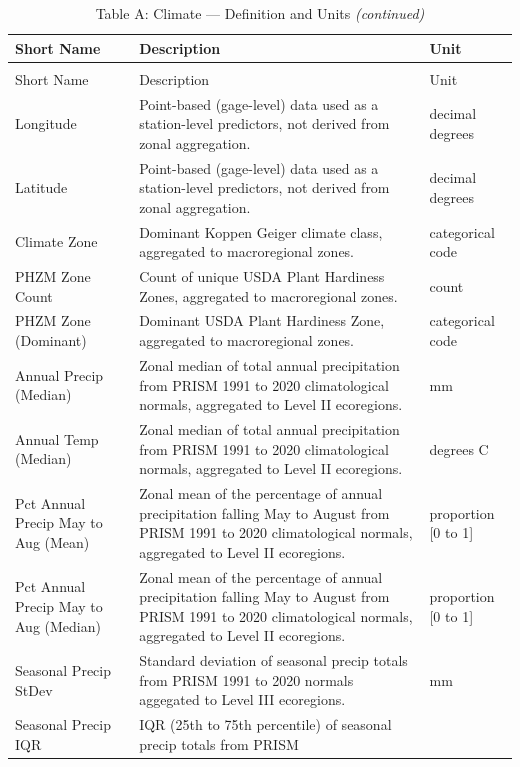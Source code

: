 \documentclass[
  10pt,
]{article}
\begin{document}
\begin{longtable}[t]{lp{8cm}l}
\caption{\label{tab:create_tables}Table A: Climate — Definition and Units}\\
\toprule
Short Name & Description & Unit\\
\midrule
\endfirsthead
\caption[]{Table A: Climate — Definition and Units \textit{(continued)}}\\
\toprule
Short Name & Description & Unit\\
\midrule
\endhead

\endfoot
\bottomrule
\endlastfoot
Longitude & Point-based (gage-level) data used as a station-level predictors, not
derived from zonal aggregation. & decimal degrees\\
Latitude & Point-based (gage-level) data used as a station-level predictors, not
derived from zonal aggregation. & decimal degrees\\
Climate Zone & Dominant Koppen Geiger climate class, aggregated to macroregional
zones. & categorical code\\
PHZM Zone Count & Count of unique USDA Plant Hardiness Zones, aggregated to
macroregional zones. & count\\
PHZM Zone (Dominant) & Dominant USDA Plant Hardiness Zone, aggregated to macroregional zones. & categorical code\\
\addlinespace
Annual Precip (Median) & Zonal median of total annual precipitation from PRISM 1991 to 2020
climatological normals, aggregated to Level II ecoregions. & mm\\
Annual Temp (Median) & Zonal median of total annual precipitation from PRISM 1991 to 2020
climatological normals, aggregated to Level II ecoregions. & degrees C\\
Pct Annual Precip May to Aug (Mean) & Zonal mean of the percentage of annual precipitation falling May to
August from PRISM 1991 to 2020 climatological normals, aggregated to
Level II ecoregions. & proportion [0 to 1]\\
Pct Annual Precip May to Aug (Median) & Zonal mean of the percentage of annual precipitation falling May to
August from PRISM 1991 to 2020 climatological normals, aggregated to
Level II ecoregions. & proportion [0 to 1]\\
Seasonal Precip StDev & Standard deviation of seasonal precip totals from PRISM 1991 to 2020
normals aggegated to Level III ecoregions. & mm\\
\addlinespace
Seasonal Precip IQR & IQR (25th to 75th percentile) of seasonal precip totals from PRISM

\end{longtable}
\end{document}
